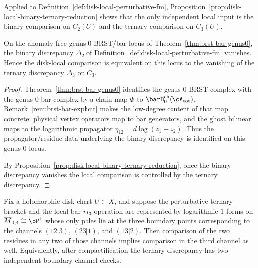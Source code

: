 \begin{remark}
Applied to Definition~\ref{def:disk-local-perturbative-fm},
Proposition~\ref{prop:disk-local-binary-ternary-reduction} shows that
the only independent local input is the binary comparison on $C_2(U)$
and the ternary comparison on $\overline{C}_3(U)$.
\end{remark}

\begin{corollary}
\label{cor:disk-local-ternary-on-brstbar-locus}
On the anomaly-free genus-$0$ BRST/bar locus of
Theorem~\ref{thm:brst-bar-genus0}, the binary discrepancy
\(\Delta_2\) of Definition~\ref{def:disk-local-perturbative-fm}
vanishes.  Hence the disk-local comparison is equivalent on this locus
to the vanishing of the ternary discrepancy \(\Delta_3\) on
\(\overline{C}_3\).
\end{corollary}

\begin{proof}
Theorem~\ref{thm:brst-bar-genus0} identifies the genus-$0$ BRST complex
with the genus-$0$ bar complex by a chain map
\(\Phi\) to \(\barB^{\mathrm{ch}}_0(\cA_{\mathrm{tot}})\).
Remark~\ref{rem:brst-bar-explicit} makes the low-degree content of that
map concrete: physical vertex operators map to bar generators, and the
ghost bilinear maps to the logarithmic propagator
\(\eta_{12}=d\log(z_1-z_2)\).
Thus the propagator/residue data underlying the binary discrepancy is
identified on this genus-$0$ locus.

By Proposition~\ref{prop:disk-local-binary-ternary-reduction}, once the
binary discrepancy vanishes the local comparison is controlled by the
ternary discrepancy.
\end{proof}

\begin{proposition}
\label{prop:compactified-ternary-two-channel}
Fix a holomorphic disk chart $U \subset X$, and suppose the
perturbative ternary bracket and the local bar $m_3$-operation are
represented by logarithmic $1$-forms on
$\overline{M}_{0,4} \cong \bP^1$ whose only poles lie at the three
boundary points corresponding to the channels
$(12|3)$, $(23|1)$, and $(13|2)$.
Then comparison of the two residues in any two of those channels
implies comparison in the third channel as well.
Equivalently, after compactification the ternary discrepancy has two
independent boundary-channel checks.
\end{proposition}

